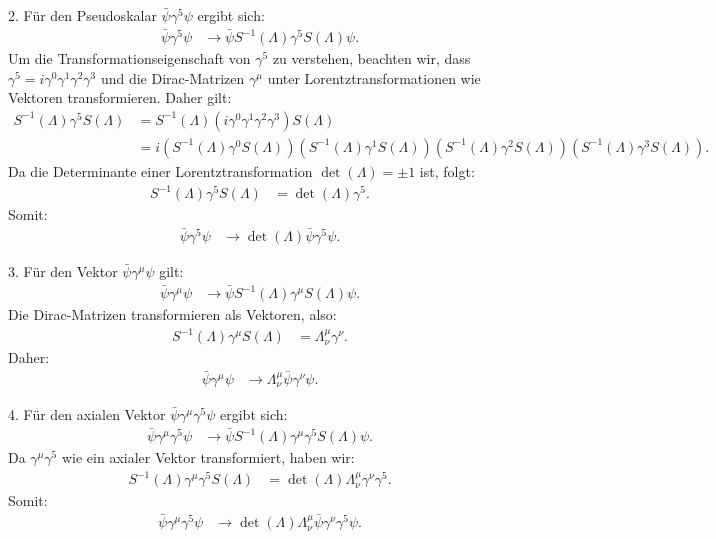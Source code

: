 \documentclass[11pt,a4paper]{article}
\begin{document}
2. Für den Pseudoskalar \(\bar{\psi} \gamma^5 \psi\) ergibt sich:
\begin{align*}
\bar{\psi} \gamma^5 \psi &\rightarrow \bar{\psi} S^{-1}(\Lambda) \gamma^5 S(\Lambda) \psi.
\end{align*}
Um die Transformationseigenschaft von \(\gamma^5\) zu verstehen, beachten wir, dass \(\gamma^5 = i\gamma^0\gamma^1\gamma^2\gamma^3\) und die Dirac-Matrizen \(\gamma^\mu\) unter Lorentztransformationen wie Vektoren transformieren. Daher gilt:
\begin{align*}
S^{-1}(\Lambda) \gamma^5 S(\Lambda) &= S^{-1}(\Lambda) (i\gamma^0\gamma^1\gamma^2\gamma^3) S(\Lambda) \\
&= i (S^{-1}(\Lambda) \gamma^0 S(\Lambda))(S^{-1}(\Lambda) \gamma^1 S(\Lambda))(S^{-1}(\Lambda) \gamma^2 S(\Lambda))(S^{-1}(\Lambda) \gamma^3 S(\Lambda)).
\end{align*}
Da die Determinante einer Lorentztransformation \(\operatorname{det}(\Lambda) = \pm 1\) ist, folgt:
\begin{align*}
S^{-1}(\Lambda) \gamma^5 S(\Lambda) &= \operatorname{det}(\Lambda) \gamma^5.
\end{align*}
Somit:
\begin{align*}
\bar{\psi} \gamma^5 \psi &\rightarrow \operatorname{det}(\Lambda) \bar{\psi} \gamma^5 \psi.
\end{align*}

3. Für den Vektor \(\bar{\psi} \gamma^\mu \psi\) gilt:
\begin{align*}
\bar{\psi} \gamma^\mu \psi &\rightarrow \bar{\psi} S^{-1}(\Lambda) \gamma^\mu S(\Lambda) \psi.
\end{align*}
Die Dirac-Matrizen transformieren als Vektoren, also:
\begin{align*}
S^{-1}(\Lambda) \gamma^\mu S(\Lambda) &= \Lambda_\nu^\mu \gamma^\nu.
\end{align*}
Daher:
\begin{align*}
\bar{\psi} \gamma^\mu \psi &\rightarrow \Lambda_\nu^\mu \bar{\psi} \gamma^\nu \psi.
\end{align*}

4. Für den axialen Vektor \(\bar{\psi} \gamma^\mu \gamma^5 \psi\) ergibt sich:
\begin{align*}
\bar{\psi} \gamma^\mu \gamma^5 \psi &\rightarrow \bar{\psi} S^{-1}(\Lambda) \gamma^\mu \gamma^5 S(\Lambda) \psi.
\end{align*}
Da \(\gamma^\mu \gamma^5\) wie ein axialer Vektor transformiert, haben wir:
\begin{align*}
S^{-1}(\Lambda) \gamma^\mu \gamma^5 S(\Lambda) &= \operatorname{det}(\Lambda) \Lambda_\nu^\mu \gamma^\nu \gamma^5.
\end{align*}
Somit:
\begin{align*}
\bar{\psi} \gamma^\mu \gamma^5 \psi &\rightarrow \operatorname{det}(\Lambda) \Lambda_\nu^\mu \bar{\psi} \gamma^\nu \gamma^5 \psi.
\end{align*}
\end{document}
